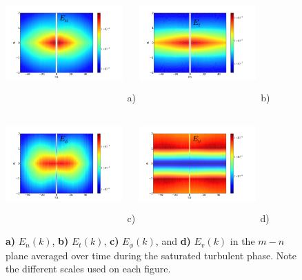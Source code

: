 \documentclass[twocolumn,showpacs,preprintnumbers,amsmath,amssymb]{revtex4}
\begin{document}
\begin{figure}
\includegraphics[width=0.40\textwidth,height=45mm]{En}~a)
\hfil
\includegraphics[width=0.40\textwidth,height=45mm]{Et}~b)
\hfil
\includegraphics[width=0.40\textwidth,height=45mm]{Ep}~c)
\hfil
\includegraphics[width=0.40\textwidth,height=45mm]{Ev}~d)
\hfil
\caption{\textbf{a)} $E_n(k)$, \textbf{b)} $E_t(k)$, \textbf{c)} $E_\phi(k)$, and \textbf{d)} $E_v(k)$ in the $m-n$ plane averaged over time during the saturated turbulent phase.
Note the different scales used on each figure.}
\label{energy_figures}
\end{figure}
\end{document}
